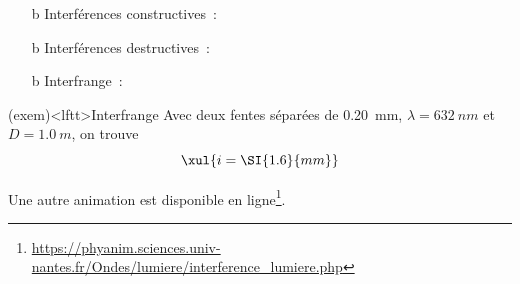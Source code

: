 \documentclass[../../main/main.tex]{subfiles}
\begin{document}
\begin{tcb*}[breakable]
	\begin{itemize}
		\item[b]{Interférences constructives}~:
		      \vspace{-15pt}
		      \vspace{-15pt}
		\item[b]{Interférences destructives}~:
		      \vspace{-15pt}
		      \vspace{-15pt}
		\item[b]{Interfrange}~:
		      \vspace{-15pt}
	\end{itemize}
	\vspace*{-15pt}
\end{tcb*}

\begin{tcb}(exem)<lftt>{Interfrange}
	Avec deux fentes séparées de \SI{0.20}{mm}, $\lambda = \SI{632}{nm}$ et $D =
		\SI{1.0}{m}$, on trouve
	\[\xul{i = \SI{1.6}{mm}}\]

	Une autre animation est disponible en
	ligne\footnote{\url{https://phyanim.sciences.univ-nantes.fr/Ondes/lumiere/interference_lumiere.php}}.
\end{tcb}
\vspace{-15pt}
\end{document}
